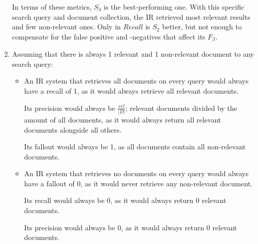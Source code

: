 \documentclass[10pt,a4paper]{article}
\begin{document}
\begin{enumerate}
        In terms of these metrics, $S_3$ is the best-performing one. With this specific search query and document collection, the IR retrieved most relevant results and few non-relevant ones. Only in $Recall$ is $S_2$ better, but not enough to compensate for the false positive and -negatives that affect its $F_\beta$.
    \item Assuming that there is always 1 relevant and 1 non-relevant document to any search query:
        \begin{itemize}
            \item An IR system that retrieves all documents on every query would always have a recall of 1, as it would always retrieve all relevant documents.
            
            Its precision would always be $\frac{rel}{|D|}$; relevant documents divided by the amount of all documents, as it would always return all relevant documents alongside all others.
            
            Its fallout would always be 1, as all documents contain all non-relevant documents.
            \item An IR system that retrieves no documents on every query would always have a fallout of 0, as it would never retrieve any non-relevant document.
            
            Its recall would always be 0, as it would always return 0 relevant documents.
            
            Its precision would always be 0, as it would always return 0 relevant documents.
        \end{itemize}
\end{enumerate}
\end{document}
